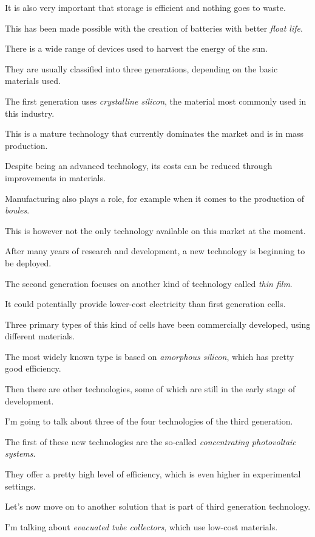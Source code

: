 \ex It is also very important that storage is efficient and nothing goes to waste.

This has been made possible with the creation of batteries with better \textit{float life}.

There is a wide range of devices used to harvest the energy of the sun.

\ex They are usually classified into three generations, depending on the basic materials used.

The first generation uses \textit{crystalline silicon}, the material most commonly used in this industry.

This is a mature technology that currently dominates the market and is in mass production.

\ex Despite being an advanced technology, its costs can be reduced through improvements in materials.

Manufacturing also plays a role, for example when it comes to the production of \textit{boules}.

This is however not the only technology available on this market at the moment.

\ex After many years of research and development, a new technology is beginning to be deployed.

The second generation focuses on another kind of technology called \textit{thin film}.

It could potentially provide lower-cost electricity than first generation cells.

\ex Three primary types of this kind of cells have been commercially developed, using different materials.

The most widely known type is based on \textit{amorphous silicon}, which has pretty good efficiency.

Then there are other technologies, some of which are still in the early stage of development.

\ex I'm going to talk about three of the four technologies of the third generation.

The first of these new technologies are the so-called \textit{concentrating photovoltaic systems}.

They offer a pretty high level of efficiency, which is even higher in experimental settings.

\ex Let's now move on to another solution that is part of third generation technology.

I'm talking about \textit{evacuated tube collectors}, which use low-cost materials.

